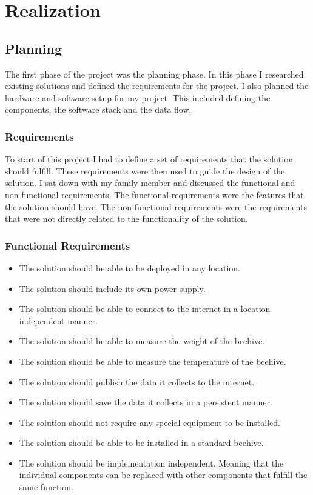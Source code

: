 \chapter{Realization}

\section{Planning}
The first phase of the project was the planning phase. In this phase I researched existing solutions and defined the requirements for the project. I also planned the hardware and software setup for my project. This included defining the components, the software stack and the data flow.

\subsection{Requirements}
To start of this project I had to define a set of requirements that the solution should fulfill. These requirements were then used to guide the design of the solution. I sat down with my family member and discussed the functional and non-functional requirements. The functional requirements were the features that the solution should have. The non-functional requirements were the requirements that were not directly related to the functionality of the solution.

\newpage
\subsection{Functional Requirements}
\begin{itemize}
    \item The solution should be able to be deployed in any location.
    \item The solution should include its own power supply.
    \item The solution should be able to connect to the internet in a location independent manner.
    \item The solution should be able to measure the weight of the beehive.
    \item The solution should be able to measure the temperature of the beehive.
    \item The solution should publish the data it collects to the internet.
    \item The solution should save the data it collects in a persistent manner.
    \item The solution should not require any special equipment to be installed.
    \item The solution should be able to be installed in a standard beehive.
    \item The solution should be implementation independent. Meaning that the individual components can be replaced with other components that fulfill the same function.
\end{itemize}
